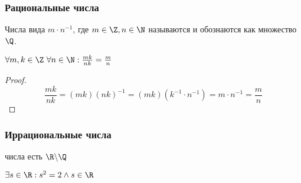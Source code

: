\documentclass[a4paper, 14pt]{article}
\begin{document}
    \subsubsection*{Рациональные числа}
    \begin{definition}
        Числа вида $m \cdot n^{-1}$, где $m \in \Z, n \in \N$ называются {} и обознаются как множество $\Q$.
    \end{definition}
    \begin{theorem}
        $\forall m, k \in \Z \ \forall n \in \N: \frac{mk}{nk}=\frac{m}{n}$
    \end{theorem}
    \begin{proof}
        \[\frac{mk}{nk} = (mk)(nk)^{-1} = (mk)(k^{-1} \cdot n^{-1}) = m \cdot n^{-1} = \frac{m}{n}\]
    \end{proof}

    \subsubsection*{Иррациональные числа}
    \begin{definition}
        { числа} есть $\R \backslash \Q$
    \end{definition}
    \begin{theorem}
        $\exists s \in \R : s^2 = 2 \land s \in \R$
    \end{theorem}
    
\end{document}
